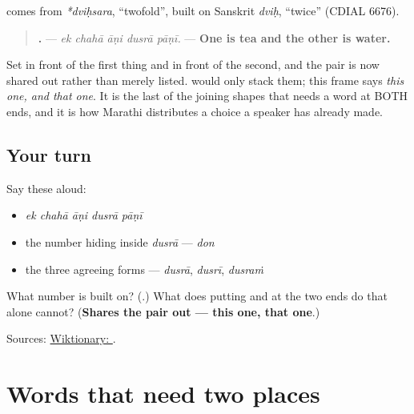 \begin{cousinweb}
\textbf{} comes from \emph{*dviḥsara}, \textquotedblleft{}twofold\textquotedblright{}, built on Sanskrit \emph{dviḥ}, \textquotedblleft{}twice\textquotedblright{} (CDIAL 6676).
\end{cousinweb}

\begin{grammarlens}[title={Grammar Lens: \mr{एक} … \mr{दुसरा} … — sharing a pair out}]
\begin{quote}
\textbf{    .} — \emph{ek chahā āṇi dusrā pāṇī.} — \textbf{One is tea and the other is water.}
\end{quote}

Set \textbf{} in front of the first thing and \textbf{} in front of the second, and the pair is now shared out rather than merely listed. \textbf{} would only stack them; this frame says \emph{this one, and that one}. It is the last of the joining shapes that needs a word at BOTH ends, and it is how Marathi distributes a choice a speaker has already made.
\end{grammarlens}

\subsection*{Your turn}
Say these aloud:

\begin{itemize}
\raggedright
  \item \emph{ek chahā āṇi dusrā pāṇī}
  \item the number hiding inside \emph{dusrā} — \emph{don}
  \item the three agreeing forms — \emph{dusrā}, \emph{dusrī}, \emph{dusraṁ}
\end{itemize}

\begin{tcolorbox}[breakable,colback=teal!4,colframe=teal!35!black,title={Before you move on}]
What number is \textbf{} built on? (\textbf{}.) What does putting \textbf{} and \textbf{} at the two ends do that \textbf{} alone cannot? (\textbf{Shares the pair out — this one, that one}.)

Sources: \href{https://en.wiktionary.org/wiki/\%E0\%A4\%A6\%E0\%A5\%81\%E0\%A4\%B8\%E0\%A4\%B0\%E0\%A4\%BE}{Wiktionary: }.
\end{tcolorbox}
\section[\texorpdfstring{\mr{ना} … \mr{ना} · … \mr{ना}? … (nā … nā · … nā? …)}{ना … ना · … ना? … (nā … nā · … nā? …)}]{Words that need two places}


